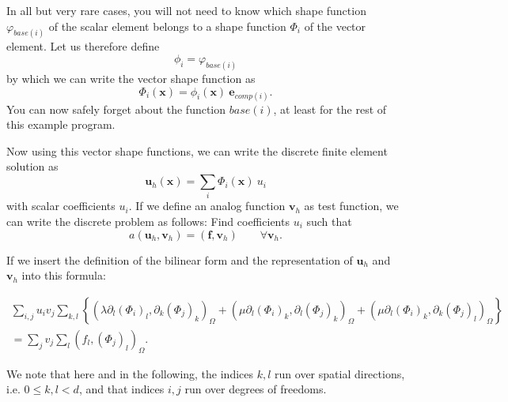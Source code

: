 \documentclass{article}
\renewcommand{\vec}[1]{{\mathbf #1}}
\begin{document}
In all but very rare cases, you will not need to know which shape function
$\varphi_{base(i)}$ of the scalar element belongs to a shape function $\Phi_i$
of the vector element. Let us therefore define
$$
  \phi_i = \varphi_{base(i)}
$$
by which we can write the vector shape function as
$$
  \Phi_i(\vec x) = \phi_{i}(\vec x)\ \vec e_{comp(i)}.
$$
You can now safely forget about the function $base(i)$, at least for the rest
of this example program.

Now using this vector shape functions, we can write the discrete finite
element solution as
$$
  \vec u_h(\vec x) = 
  \sum_i \Phi_i(\vec x)\ u_i
$$
with scalar coefficients $u_i$. If we define an analog function $\vec v_h$ as
test function, we can write the discrete problem as follows: Find coefficients
$u_i$ such that
$$
  a(\vec u_h, \vec v_h) = (\vec f, \vec v_h)
  \qquad
  \forall \vec v_h.
$$

If we insert the definition of the bilinear form and the representation of
$\vec u_h$ and $\vec v_h$ into this formula:
\begin{center}
\begin{multline*}
  \sum_{i,j}
    u_i v_j
  \sum_{k,l}
  \left\{
  \left(
    \lambda \partial_l (\Phi_i)_l, \partial_k (\Phi_j)_k
  \right)_\Omega
  +
  \left(
    \mu \partial_l (\Phi_i)_k, \partial_l (\Phi_j)_k
  \right)_\Omega  
  +
  \left(
    \mu \partial_l (\Phi_i)_k, \partial_k (\Phi_j)_l
  \right)_\Omega  
  \right\}
\\
=
  \sum_j v_j
  \sum_l
  \left(
    f_l,
    (\Phi_j)_l
  \right)_\Omega.
\end{multline*}
\end{center}
We note that here and in the following, the indices $k,l$ run over spatial
directions, i.e. $0\le k,l < d$, and that indices $i,j$ run over degrees
of freedoms.
\end{document}
